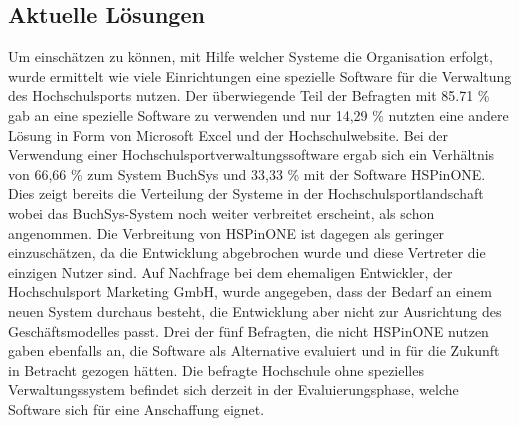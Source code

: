 \subsection{Aktuelle Lösungen}
Um einschätzen zu können, mit Hilfe welcher Systeme die Organisation erfolgt, wurde ermittelt wie viele Einrichtungen eine spezielle Software für die Verwaltung des Hochschulsports nutzen. Der überwiegende Teil der Befragten mit 85.71 \% gab an eine spezielle Software zu verwenden und nur 14,29 \% nutzten eine andere Lösung in Form von Microsoft Excel und der Hochschulwebsite. Bei der Verwendung einer Hochschulsportverwaltungssoftware ergab sich ein Verhältnis von 66,66 \% zum System BuchSys und 33,33 \% mit der Software HSPinONE. Dies zeigt bereits die Verteilung der Systeme in der Hochschulsportlandschaft wobei das BuchSys-System noch weiter verbreitet erscheint, als schon angenommen. Die Verbreitung von HSPinONE ist dagegen als geringer einzuschätzen, da die Entwicklung abgebrochen wurde und diese Vertreter die einzigen Nutzer sind. Auf Nachfrage bei dem ehemaligen Entwickler, der Hochschulsport Marketing GmbH, wurde angegeben, dass der Bedarf an einem neuen System durchaus besteht, die Entwicklung aber nicht zur Ausrichtung des Geschäftsmodelles passt. Drei der fünf Befragten, die nicht HSPinONE nutzen gaben ebenfalls an, die Software als Alternative evaluiert und in für die Zukunft in Betracht gezogen hätten. Die befragte Hochschule ohne spezielles Verwaltungssystem befindet sich derzeit in der Evaluierungsphase, welche Software sich für eine Anschaffung eignet.
\\

